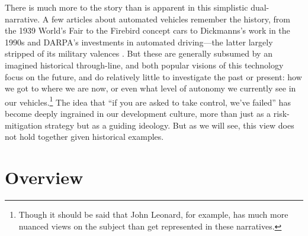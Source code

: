 There is much more to the story than is
apparent in this simplistic dual-narrative.  A few
articles about automated vehicles remember the history, from the 1939
World's Fair \cite{CBSPetersen} to the Firebird concept cars
\cite{walshVs} to Dickmanns's work in the 
1990s \cite{HCRIDriverless} and DARPA's investments in automated
driving---the latter largely stripped of its
 military valences \cite{economistSR}. But these are generally subsumed by an imagined
 historical through-line, and both popular visions of this
technology focus on the future, and do relatively little to
investigate the past or present: how we got to 
where we are now, or even what level of autonomy we currently see in
our vehicles.\footnote{Though it should
  be said that John Leonard, for example, has much more nuanced views
  on the subject than get represented in these narratives.} The idea that ``if you are asked to take control, we've
failed'' has become deeply ingrained in our development
culture, more than just as a risk-mitigation strategy but as a guiding
ideology. But as we will see, this view does not hold together given
historical examples.





\section{Overview}


